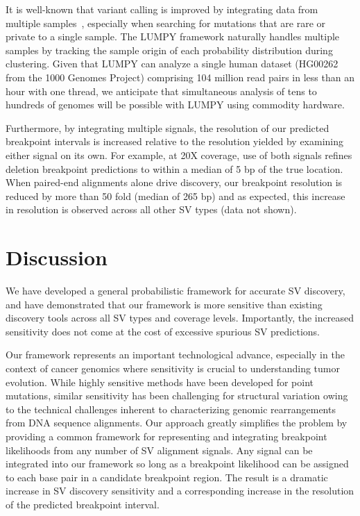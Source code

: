 \documentclass[10pt]{bmc_article}
\newenvironment{bmcformat}{\begin{raggedright}\baselineskip20pt\sloppy\setboolean{publ}{false}}{\end{raggedright}\baselineskip20pt\sloppy}
\begin{document}
\begin{bmcformat}
It is well-known that variant calling is improved by integrating data from
multiple samples~\cite{handsaker2011, mckenna2010, hormozdiari2011,
quinlan2011}, especially when searching for mutations that are rare or private
to a single sample. The LUMPY framework naturally handles multiple samples by
tracking the sample origin of each probability distribution during clustering.
Given that LUMPY can analyze a single human dataset (HG00262 from the 1000
Genomes Project) comprising 104 million read pairs in less than an hour with one
thread, we anticipate that simultaneous analysis of tens to hundreds of genomes
will be possible with LUMPY using commodity hardware.

Furthermore, by integrating multiple signals, the resolution of our
predicted breakpoint intervals is increased relative to the resolution yielded
by examining either signal on its own. For example, at 20X coverage, use of both
signals refines deletion breakpoint predictions to within a median of 5 bp of
the true location. When paired-end alignments alone drive discovery, our
breakpoint resolution is reduced by more than 50 fold (median of 265 bp) and as
expected, this increase in resolution is observed across all other SV types
(data not shown).

\section*{Discussion}
We have developed a general probabilistic framework for accurate SV discovery,
and have demonstrated that our framework is more sensitive than existing
discovery tools across all SV types and coverage levels. Importantly, the
increased sensitivity does not come at the cost of excessive spurious SV
predictions.

Our framework represents an important technological advance, especially in the
context of cancer genomics where sensitivity is crucial to understanding tumor
evolution. While highly sensitive methods have been developed for point
mutations, similar sensitivity has been challenging for structural variation
owing to the technical challenges inherent to characterizing genomic
rearrangements from DNA sequence alignments. Our approach greatly simplifies the
problem by providing a common framework for representing and integrating
breakpoint likelihoods from any number of SV alignment signals. Any signal can
be integrated into our framework so long as a breakpoint likelihood can be
assigned to each base pair in a candidate breakpoint region. The result is a
dramatic increase in SV discovery sensitivity and a corresponding increase in
the resolution of the predicted breakpoint interval.


\end{bmcformat}
\end{document}
